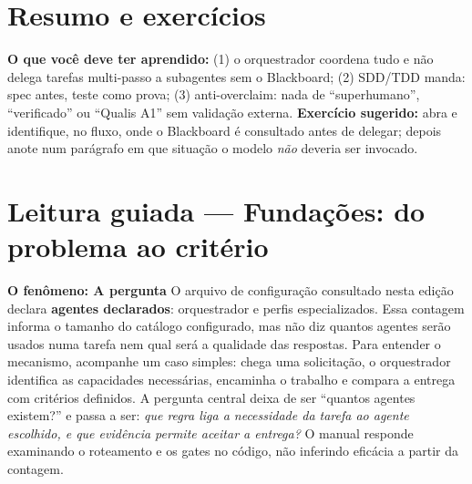 \section{Resumo e exercícios}

\begin{resultado}
\textbf{O que você deve ter aprendido:} (1) o orquestrador 
coordena tudo e não delega tarefas multi-passo a subagentes sem o Blackboard;
(2) SDD/TDD manda: spec antes, teste como prova; (3) anti-overclaim: nada de
``superhumano'', ``verificado'' ou ``Qualis A1'' sem validação externa.
\textbf{Exercício sugerido:} abra  e
identifique, no fluxo, onde o Blackboard é consultado antes de delegar; depois
anote num parágrafo em que situação o modelo \emph{não} deveria ser invocado.
\end{resultado}



\section[Leitura guiada]{Leitura guiada — Fundações: do problema ao critério}


\begin{descricao}
\textbf{O fenômeno: A pergunta}  O arquivo de configuração consultado nesta edição declara
\textbf{\CoreAgentCount{} agentes declarados}: orquestrador e perfis especializados. Essa contagem informa o
tamanho do catálogo configurado, mas não diz quantos agentes serão usados numa
tarefa nem qual será a qualidade das respostas. Para entender o mecanismo,
acompanhe um caso simples: chega uma solicitação, o orquestrador identifica as
capacidades necessárias, encaminha o trabalho e compara a entrega com critérios
definidos. A pergunta central deixa de ser ``quantos agentes existem?'' e passa a
ser: \emph{que regra liga a necessidade da tarefa ao agente escolhido, e que
evidência permite aceitar a entrega?} O manual responde examinando o roteamento e
os gates no código, não inferindo eficácia a partir da contagem.
\end{descricao}

